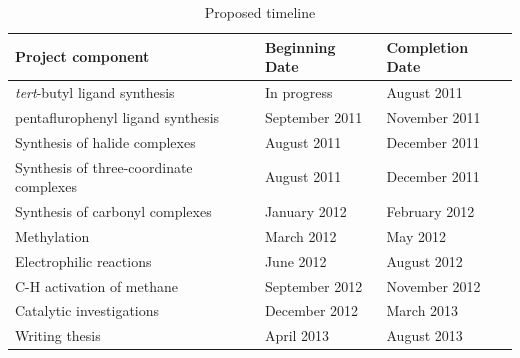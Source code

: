 \begin{table}[h]
\caption[Proposed timeline]{Proposed timeline}
\label{Timeline}
\begin{center}
    \begin{tabular}{l l l}
    \hline
Project component					& Beginning Date 	& Completion Date	\\ \hline
\emph{tert}-butyl ligand synthesis		& In progress		& August 2011		\\
pentaflurophenyl ligand synthesis		& September 2011	& November 2011	\\
Synthesis of halide complexes			& August 2011		& December 2011	\\
Synthesis of three-coordinate complexes	& August 2011		& December 2011	\\
Synthesis of carbonyl complexes		& January 2012	& February 2012	\\
Methylation 						& March 2012		& May 2012		\\
Electrophilic reactions				& June 2012		& August 2012		\\
C-H activation of methane			& September 2012	& November 2012	\\
Catalytic investigations				& December 2012 	& March 2013		\\
Writing thesis 						& April 2013		& August 2013		\\
    \hline
    \end{tabular}
    \end{center} 
    \end{table}


	
	

